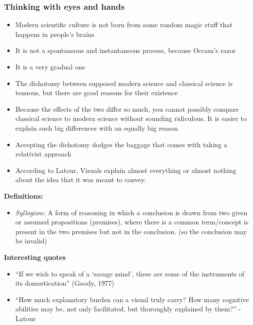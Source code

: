 \documentclass[a4paper]{article}
\begin{document}
\subsubsection{Thinking with eyes and hands}
\begin{itemize}
	\item Modern scientific culture is not born from some random magic stuff that happens in people’s brains
	\item It is not a spontaneous and instantaneous process, because Occam’s razor
	\item It is a very gradual one
	\item The dichotomy between supposed modern science and classical science is tenuous, but there are good reasons for their existence
	\item Because the effects of the two differ so much, you cannot possibly compare classical science to modern science without sounding ridiculous. It is easier to explain such big differences with an equally big reason
	\item Accepting the dichotomy dodges the baggage that comes with taking a relativist approach
	\item According to Latour, Visuals explain almost everything or almost nothing about the idea that it was meant to convey. 
\end{itemize}
\noindent\textbf{Definitions:}
\begin{itemize}
	\item \textit{Syllogism:} A form of reasoning in which a conclusion is drawn from two given or assumed propositions (premises), where there is a common term/concept is present in the two premises but not in the conclusion. (so the conclusion may be invalid)
\end{itemize}
\noindent\textbf{Interesting quotes}
\begin{itemize}
	\item ``If we wish to speak of a `savage mind', these are some of the instruments of its domestication'' (Goody, 1977)
	\item ``How much explanatory burden can a visual truly carry? How many cognitive abilities may be, not only facilitated, but thoroughly explained by them?'' - Latour
\end{itemize}
\end{document}
